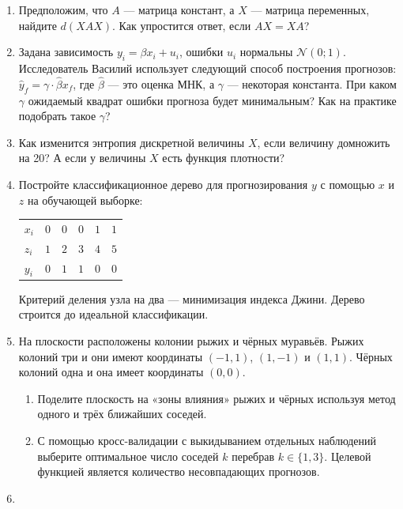 \documentclass[11pt]{article}
\def \hb{\hat{\beta}}
\def \cN{\mathcal{N}}
\begin{document}
\begin{enumerate}

  \item Предположим, что $A$ — матрица констант, а $X$ — матрица переменных, найдите $d(XAX)$. Как упростится ответ, если $AX=XA$?

  \item Задана зависимость $y_i = \beta x_i + u_i$, ошибки $u_i$ нормальны $\cN(0;1)$. Исследователь Василий использует следующий способ построения прогнозов: $\hat y_f = \gamma \cdot \hb x_f$, где $\hb$ — это оценка МНК, а $\gamma$ — некоторая константа. При каком $\gamma$ ожидаемый квадрат ошибки прогноза будет минимальным? Как на практике подобрать такое $\gamma$?

  \item Как изменится энтропия дискретной величины $X$, если величину домножить на 20? А если у величины $X$ есть функция плотности?

  \item 
Постройте классификационное дерево для прогнозирования $y$ с помощью $x$ и $z$ на обучающей выборке:

\begin{tabular}{lrrrrr}
\toprule
$x_i$ & $0$ & $0$ & $0$ & $1$ & $1$ \\
$z_i$ & $1$ & $2$ & $3$ & $4$ & $5$ \\
$y_i$ & $0$ & $1$ & $1$ & $0$ & $0$ \\
\bottomrule
\end{tabular}

Критерий деления узла на два — минимизация индекса Джини. Дерево строится до идеальной классификации.

\item 
На плоскости расположены колонии рыжих и чёрных муравьёв. Рыжих колоний три и они имеют координаты $(-1, 1)$, $(1, -1)$ и $(1, 1)$. Чёрных колоний одна и она имеет координаты $(0, 0)$.

\begin{enumerate}
  \item Поделите плоскость на «зоны влияния» рыжих и чёрных используя метод одного и трёх ближайших соседей.
  
\item С помощью кросс-валидации с выкидыванием отдельных наблюдений выберите оптимальное число соседей $k$ перебрав $k \in \{1, 3 \}$. Целевой функцией является количество несовпадающих прогнозов.
\end{enumerate}

\item 


\end{enumerate}
\end{document}

